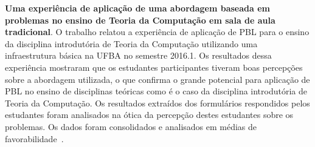 \item{\textbf{Uma experiência de aplicação de uma
abordagem baseada em problemas no ensino
de Teoria da Computação em sala de aula tradicional}.
O trabalho relatou a experiência de aplicação de \ac{PBL}
para o ensino da disciplina introdutória de Teoria da
Computação utilizando uma infraestrutura básica na
\ac{UFBA} no semestre 2016.1.
Os resultados dessa experiência mostraram que os estudantes participantes
tiveram boas percepções sobre a abordagem utilizada, o que confirma o
grande potencial para aplicação de \ac{PBL} no ensino de
disciplinas teóricas como é o caso da disciplina introdutória de
Teoria da Computação.
Os resultados extraídos dos formulários respondidos pelos estudantes
foram analisados na ótica da percepção
destes estudantes sobre os problemas.
Os dados foram consolidados e analisados em médias
de favorabilidade~\cite{gavaza2017}.}

